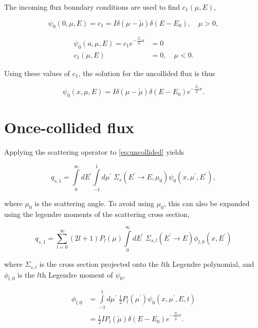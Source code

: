 \documentclass{hw-template}
\newcommand{\p}{^\prime}
\begin{document}
The incoming flux boundary conditions are used to find $c_1(\mu, E)$,

\begin{equation}
    \psi_0(0, \mu, E) = c_1 = I \delta(\mu - \tilde{\mu})\delta(E-E_0), \quad \mu > 0,
\end{equation}

\begin{align}
    \psi_0(a, \mu, E) = c_1 e^{-\frac{\Sigma_t}{\mu}a} &= 0\\
    c_1(\mu, E) &= 0, \quad \mu < 0.
\end{align}

Using these values of $c_1$, the solution for the uncollided flux is thus

\begin{equation}\label{eq:uncollided}
    \psi_0(x, \mu, E) =  I\delta(\mu - \tilde{\mu})\delta(E-E_0) e^{-\frac{\Sigma_t}{\mu}x}.
\end{equation}


\section{Once-collided flux}

Applying the scattering operator to \autoref{eq:uncollided} yields

\begin{equation}
    q_{s, 1} = \int\limits_{0}^{\infty}dE\p\int\limits_{-1}^{1}d\mu\p\; \Sigma_s(E\p \rightarrow E, \mu_0)\psi_0(x, \mu\p, E\p),
\end{equation}

where $\mu_0$ is the scattering angle. To avoid using $\mu_0$, this can also be expanded using the legendre moments of the scattering cross section,

\begin{equation}
    q_{s, 1} = \sum_{l=0}^\infty (2l + 1)P_l(\mu) \int\limits_{0}^{\infty}dE\p\; \Sigma_{s,l}(E\p \rightarrow E)\phi_{l, 0}(x, E\p)
\end{equation}

where $\Sigma_{s, l}$ is the cross section projected onto the $l$th Legendre polynomial, and $\phi_{l, 0}$ is the $l$th Legendre moment of $\psi_0$,

\begin{align}
    \phi_{l, 0} &= \int\limits_{-1}^1 d\mu\p\; \frac{1}{2}P_l(\mu\p)\psi_0(x, \mu\p, E, t)\\
    &=  \frac{1}{2}IP_l(\tilde{\mu})\delta(E-E_0) e^{-\frac{\Sigma_t}{\tilde{\mu}}x}.
\end{align}
\end{document}
